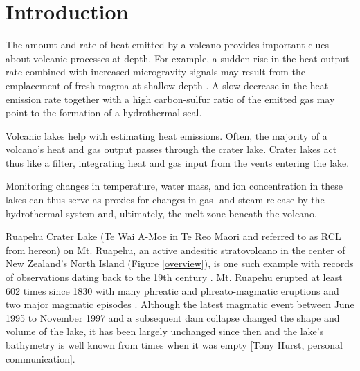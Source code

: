\documentclass{bmc_template/bmcart}
\begin{document}


\section{Introduction}

The amount and rate of heat emitted by a volcano provides important clues about
volcanic processes at depth. For example, a sudden rise in the heat output rate
combined with increased microgravity signals may result from the emplacement of
fresh magma at shallow depth \cite{Brown1991}. A slow decrease in the heat
emission rate together with a high carbon-sulfur ratio of the emitted gas may
point to the formation of a hydrothermal seal.

Volcanic lakes help with estimating heat emissions. Often, the majority of a
volcano's heat and gas output passes through the crater lake. Crater lakes act thus
like a filter, integrating heat and gas input from the vents entering the lake.

Monitoring changes in temperature, water mass, and ion concentration in these
lakes can thus serve as proxies for changes in gas- and steam-release by the
hydrothermal system and, ultimately, the melt zone beneath the volcano. 

Ruapehu Crater Lake (Te Wai A-Moe in Te Reo Maori and referred to as RCL from
hereon) on Mt. Ruapehu, an active andesitic stratovolcano in the center of New
Zealand's North Island (Figure \ref{overview}), is one such example with records
of observations dating back to the 19th century \cite{Friedlander1898}. Mt.
Ruapehu erupted at least 602 times since 1830 with many phreatic and
phreato-magmatic eruptions and two major magmatic episodes \citep{Scott2013}.
Although the latest magmatic event between June 1995 to November 1997 and a
subsequent dam collapse changed the shape and volume of the lake, it has been
largely unchanged since then and the lake's bathymetry is well known from times
when it was empty [Tony Hurst, personal communication].
\end{document}
